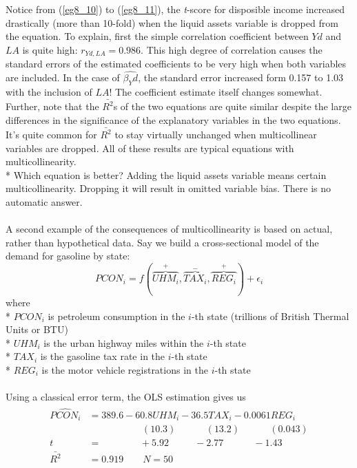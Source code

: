\documentclass[11pt]{article}
\begin{document}
Notice from (\ref{eg8_10}) to (\ref{eg8_11}), the \textit{t}-score for disposible income increased drastically (more than 10-fold) when the liquid assets variable is dropped from the equation. To explain, first the simple correlation coefficient between $Yd$ and $LA$ is quite high: $r_{Yd, LA} = 0.986$. This high degree of correlation causes the standard errors of the estimated coefficients to be very high when both variables are included. In the case of $\hat{\beta_Yd}$, the standard error increased form 0.157 to 1.03 with the inclusion of $LA$! The coefficient estimate itself changes somewhat. Further, note that the $\bar{R^2}$s of the two equations are quite similar despite the large differences in the significance of the explanatory variables in the two equations. It's quite common for $\bar{R^2}$ to stay virtually unchanged when multicollinear variables are dropped. All of these results are typical equations with multicollinearity. \\*
Which equation is better? Adding the liquid assets variable means certain multicollinearity. Dropping it will result in omitted variable bias. There is no automatic answer. \\ \\
A second example of the consequences of multicollinearity is based on actual, rather than hypothetical data. Say we build a cross-sectional model of the demand for gasoline by state:
\begin{equation}
PCON_i = f(\overbrace{UHM_i}^+, \overbrace{TAX_i}^-, \overbrace{REG_i}^+) + \epsilon_i \label{eg8_12}
\end{equation}
where\\*
$PCON_i$ is petroleum consumption in the $i$-th state (trillions of British Thermal Units or BTU)\\*
$UHM_i$ is the urban highway miles within the $i$-th state\\*
$TAX_i$ is the gasoline tax rate in the $i$-th state\\*
$REG_i$ is the motor vehicle registrations in the $i$-th state\\ \\
Using a classical error term, the OLS estimation gives us
\begin{align}
\label{eg8_13}
\begin{split}
\widehat{PCON_i} &= 389.6 - {60.8UHM_i} - {36.5TAX_i} - {0.0061REG_i}\\
&\>\>\>\>\>\>\>\>\>\>\>\>\>\>\>\>\>\>\>\>\>\>\>\>\> (10.3) 
\>\>\>\>\>\>\>\>\>\>\>\>\>\> (13.2)
\>\>\>\>\>\>\>\>\>\>\>\>\>\> (0.043)\\
t&=\>\>\>\>\>\>\>\>\>\>\>\>\>\>\>\>\>\> +5.92 
\>\>\>\>\>\>\>\>\>\>\>\> -2.77
\>\>\>\>\>\>\>\>\>\>\>\>\>\> -1.43\\
\bar{R^2}&= 0.919 \quad\quad N=50
\end{split}
\end{align}
\end{document}
